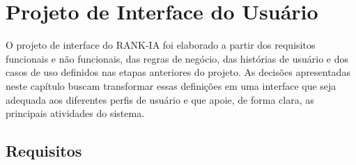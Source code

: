 \documentclass[a4paper,12pt,oneside,openany]{book}
\begin{document}

\chapter{Projeto de Interface do Usuário}

O projeto de interface do RANK-IA foi elaborado a partir dos requisitos funcionais e não funcionais, das regras de negócio, das histórias de usuário e dos casos de uso definidos nas etapas anteriores do projeto. As decisões apresentadas neste capítulo buscam transformar essas definições em uma interface que seja adequada aos diferentes perfis de usuário e que apoie, de forma clara, as principais atividades do sistema.

\section{Requisitos}
\end{document}
